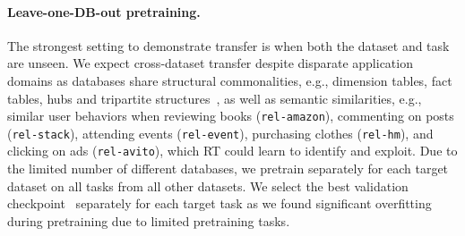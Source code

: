 \paragraph{Leave-one-DB-out pretraining.}
The strongest setting to demonstrate transfer is
when both the dataset and task are unseen.
We expect cross-dataset transfer despite disparate application domains as
databases share structural commonalities, e.g.,
dimension tables, fact tables, hubs and tripartite structures~\citep{relgnn},
as well as semantic similarities, e.g.,
similar user behaviors
when
reviewing books (\texttt{rel-amazon}),
commenting on posts (\texttt{rel-stack}),
attending events (\texttt{rel-event}),
purchasing clothes (\texttt{rel-hm}),
and clicking on ads (\texttt{rel-avito}),
which RT could learn to identify and exploit.
Due to the limited number of different databases,
we pretrain separately for each target dataset
on all tasks from all other datasets.
We select the best validation checkpoint~\citep{ranjan2024post}
separately for each target task as
we found significant overfitting during pretraining
due to limited pretraining tasks.





